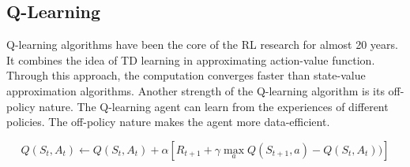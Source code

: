 \subsection{Q-Learning}

Q-learning algorithms have been the core of the RL research for almost 20 years. It combines the idea of TD learning in approximating action-value function. Through this approach, the computation converges faster than state-value approximation algorithms. Another strength of the Q-learning algorithm is its off-policy nature. The Q-learning agent can learn from the experiences of different policies. The off-policy nature makes the agent more data-efficient.

\begin{equation}
    Q(S_t, A_t) \longleftarrow Q(S_t, A_t) + \alpha [R_{t+1} + \gamma \max\limits_{a}Q(S_{t+1}, a)- Q(S_t, A_t))] 
\end{equation}
